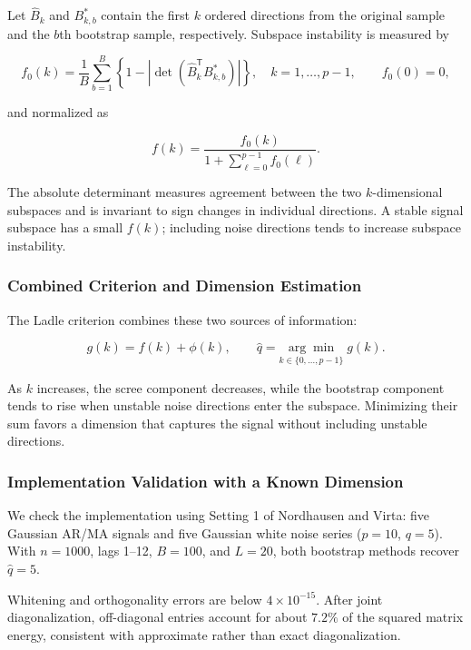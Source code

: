 \documentclass[
  english,
  11pt,
  a4paper,
]{article}
\begin{document}
Let \(\widehat B_k\) and \(B^*_{k,b}\) contain the first \(k\) ordered
directions from the original sample and the \(b\)th bootstrap sample,
respectively. Subspace instability is measured by

\[
f_0(k)=\frac{1}{B}\sum_{b=1}^{B}
\left\{1-\left|\det\!\left(\widehat B_k^{\mathsf T}B^*_{k,b}\right)\right|\right\},
\quad k=1,\ldots,p-1,
\qquad f_0(0)=0,
\]

and normalized as

\[
f(k)=\frac{f_0(k)}{1+\sum_{\ell=0}^{p-1}f_0(\ell)}.
\]

The absolute determinant measures agreement between the two
\(k\)-dimensional subspaces and is invariant to sign changes in
individual directions. A stable signal subspace has a small \(f(k)\);
including noise directions tends to increase subspace instability.

\subsubsection{Combined Criterion and Dimension
Estimation}\label{combined-criterion-and-dimension-estimation}

The Ladle criterion combines these two sources of information:

\[
g(k)=f(k)+\phi(k),\qquad
\widehat q=\underset{k\in\{0,\ldots,p-1\}}{\arg\min}\;g(k).
\]

As \(k\) increases, the scree component decreases, while the bootstrap
component tends to rise when unstable noise directions enter the
subspace. Minimizing their sum favors a dimension that captures the
signal without including unstable directions.

\subsubsection{Implementation Validation with a Known
Dimension}\label{implementation-validation-with-a-known-dimension}

We check the implementation using Setting 1 of Nordhausen and Virta:
five Gaussian AR/MA signals and five Gaussian white noise series
(\(p=10\), \(q=5\)). With \(n=1000\), lags 1--12, \(B=100\), and
\(L=20\), both bootstrap methods recover \(\widehat q=5\).

Whitening and orthogonality errors are below \(4\times10^{-15}\). After
joint diagonalization, off-diagonal entries account for about \(7.2\%\)
of the squared matrix energy, consistent with approximate rather than
exact diagonalization.
\end{document}
